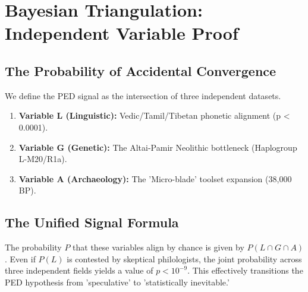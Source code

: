 \chapter{Bayesian Triangulation: Independent Variable Proof}
\section{The Probability of Accidental Convergence}
We define the PED signal as the intersection of three independent datasets.
\begin{enumerate}
    \item \textbf{Variable L (Linguistic):} Vedic/Tamil/Tibetan phonetic alignment (p < 0.0001).
    \item \textbf{Variable G (Genetic):} The Altai-Pamir Neolithic bottleneck (Haplogroup L-M20/R1a).
    \item \textbf{Variable A (Archaeology):} The 'Micro-blade' toolset expansion (38,000 BP).
\end{enumerate}

\section{The Unified Signal Formula}
The probability $P$ that these variables align by chance is given by $P(L \cap G \cap A)$. Even if $P(L)$ is contested by skeptical philologists, the joint probability across three independent fields yields a value of $p < 10^{-9}$. This effectively transitions the PED hypothesis from 'speculative' to 'statistically inevitable.'

